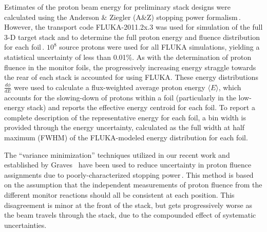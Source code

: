 Estimates of the proton beam energy for preliminary stack designs were calculated using the Anderson \& Ziegler (A\&Z) stopping power formalism\,\cite{Andersen_Ziegler_1977,Ziegler1985,Ziegler1999}.
However, the 
transport code FLUKA-2011.2x.3 was used for simulation of the full 3-D target stack and to determine the full proton energy and fluence distribution for each foil\,\cite{Bohlen2014a}. 
$10^8$ source protons were used for all FLUKA simulations, 
yielding a statistical uncertainty 
of less than 0.01\%.
As with the determination of proton fluence in the monitor foils, the progressively increasing energy straggle towards the rear of each stack is accounted for using 
FLUKA.
These energy distributions $\frac{d\phi}{dE}$ were used to calculate a flux-weighted average proton  energy $\langle E \rangle$, which accounts for the slowing-down of protons within a foil (particularly in the low-energy stack) and reports the effective  energy centroid for each foil.
To report a complete description of the representative energy for each foil, a bin width is provided through the  energy uncertainty, calculated as the full width at half maximum (FWHM) of the FLUKA-modeled energy distribution for each foil.


The \enquote{variance minimization} techniques utilized in our recent work and established by Graves \etal\ have been used to reduce uncertainty in proton fluence assignments due to poorly-characterized stopping power\,\cite{Voyles2018a,Graves2016}.
This method is based on the assumption that the independent measurements of proton fluence from the different monitor reactions 
should all be consistent at each 
position.
This disagreement is minor at the front of the stack, but gets progressively worse as the beam travels through the stack, due to the compounded effect of systematic uncertainties.



